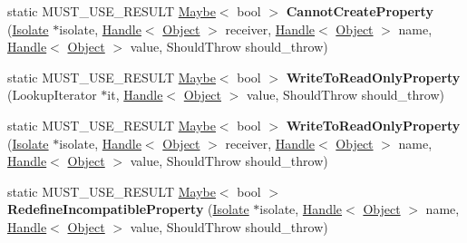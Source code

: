 \begin{DoxyCompactItemize}
\item 
static M\+U\+S\+T\+\_\+\+U\+S\+E\+\_\+\+R\+E\+S\+U\+LT \hyperlink{classv8_1_1_maybe}{Maybe}$<$ bool $>$ {\bfseries Cannot\+Create\+Property} (\hyperlink{classv8_1_1internal_1_1_isolate}{Isolate} $\ast$isolate, \hyperlink{classv8_1_1internal_1_1_handle}{Handle}$<$ \hyperlink{classv8_1_1internal_1_1_object}{Object} $>$ receiver, \hyperlink{classv8_1_1internal_1_1_handle}{Handle}$<$ \hyperlink{classv8_1_1internal_1_1_object}{Object} $>$ name, \hyperlink{classv8_1_1internal_1_1_handle}{Handle}$<$ \hyperlink{classv8_1_1internal_1_1_object}{Object} $>$ value, Should\+Throw should\+\_\+throw)\hypertarget{classv8_1_1internal_1_1_object_ae9c84534abe89b89a33cbf30d0ac6120}{}\label{classv8_1_1internal_1_1_object_ae9c84534abe89b89a33cbf30d0ac6120}

\item 
static M\+U\+S\+T\+\_\+\+U\+S\+E\+\_\+\+R\+E\+S\+U\+LT \hyperlink{classv8_1_1_maybe}{Maybe}$<$ bool $>$ {\bfseries Write\+To\+Read\+Only\+Property} (Lookup\+Iterator $\ast$it, \hyperlink{classv8_1_1internal_1_1_handle}{Handle}$<$ \hyperlink{classv8_1_1internal_1_1_object}{Object} $>$ value, Should\+Throw should\+\_\+throw)\hypertarget{classv8_1_1internal_1_1_object_a8d3a8657fc2a4729c61eaa29fb365476}{}\label{classv8_1_1internal_1_1_object_a8d3a8657fc2a4729c61eaa29fb365476}

\item 
static M\+U\+S\+T\+\_\+\+U\+S\+E\+\_\+\+R\+E\+S\+U\+LT \hyperlink{classv8_1_1_maybe}{Maybe}$<$ bool $>$ {\bfseries Write\+To\+Read\+Only\+Property} (\hyperlink{classv8_1_1internal_1_1_isolate}{Isolate} $\ast$isolate, \hyperlink{classv8_1_1internal_1_1_handle}{Handle}$<$ \hyperlink{classv8_1_1internal_1_1_object}{Object} $>$ receiver, \hyperlink{classv8_1_1internal_1_1_handle}{Handle}$<$ \hyperlink{classv8_1_1internal_1_1_object}{Object} $>$ name, \hyperlink{classv8_1_1internal_1_1_handle}{Handle}$<$ \hyperlink{classv8_1_1internal_1_1_object}{Object} $>$ value, Should\+Throw should\+\_\+throw)\hypertarget{classv8_1_1internal_1_1_object_a291d978a09211b8839995f895015d2da}{}\label{classv8_1_1internal_1_1_object_a291d978a09211b8839995f895015d2da}

\item 
static M\+U\+S\+T\+\_\+\+U\+S\+E\+\_\+\+R\+E\+S\+U\+LT \hyperlink{classv8_1_1_maybe}{Maybe}$<$ bool $>$ {\bfseries Redefine\+Incompatible\+Property} (\hyperlink{classv8_1_1internal_1_1_isolate}{Isolate} $\ast$isolate, \hyperlink{classv8_1_1internal_1_1_handle}{Handle}$<$ \hyperlink{classv8_1_1internal_1_1_object}{Object} $>$ name, \hyperlink{classv8_1_1internal_1_1_handle}{Handle}$<$ \hyperlink{classv8_1_1internal_1_1_object}{Object} $>$ value, Should\+Throw should\+\_\+throw)\hypertarget{classv8_1_1internal_1_1_object_af47e73a2fa0e5ea33bec36669045b5a5}{}\label{classv8_1_1internal_1_1_object_af47e73a2fa0e5ea33bec36669045b5a5}


\end{DoxyCompactItemize}
